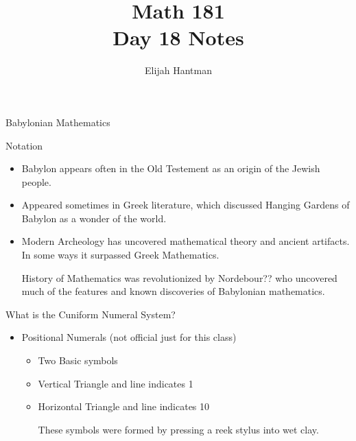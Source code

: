 \documentclass{report}
\title{\Huge{Math 181}\\Day 18 Notes}
\author{\huge{Elijah Hantman}}
\date{}
\begin{document}
\maketitle
\newpage

\begin{description}
    \item {\large Babylonian Mathematics} 
    \item Notation
        \begin{mdframed}
           \begin{itemize}
               \item Babylon appears often in the Old Testement
                   as an origin of the Jewish people.
               \item Appeared sometimes in Greek literature,
                   which discussed Hanging Gardens of Babylon
                   as a wonder of the world.
               \item Modern Archeology has uncovered mathematical
                   theory and ancient artifacts. In some ways
                   it surpassed Greek Mathematics.
                   \begin{mdframed}
                       History of Mathematics was revolutionized
                       by Nordebour?? who uncovered much
                       of the features and known discoveries of
                       Babylonian mathematics.
                   \end{mdframed}
           \end{itemize} 
        \end{mdframed}
    \item What is the Cuniform Numeral System?
        \begin{mdframed}
            \begin{itemize}
                \item Positional Numerals (not official just for this class)
                    \begin{itemize}
                        \item Two Basic symbols
                        \item Vertical Triangle and line indicates 1
                        \item Horizontal Triangle and line indicates 10
                            \begin{mdframed}
                                These symbols were formed by pressing
                                a reek stylus into wet clay.


\end{mdframed}
\end{itemize}
\end{itemize}
\end{mdframed}
\end{description}
\end{document}
